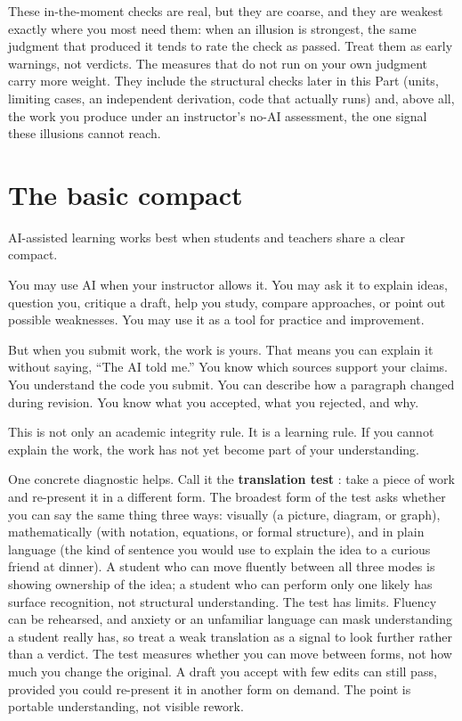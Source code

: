 \documentclass{SIAMbook2023}
\newcommand{\keyterm}[2][\relax]{%
  \textbf{#2}%
  \ifx\relax#1\index{#2|textbf}\else\index{#1|textbf}\fi}
\begin{document}
These in-the-moment checks are real, but they are coarse, and they are weakest exactly where you most need them: when an illusion is strongest, the same judgment that produced it tends to rate the check as passed. Treat them as early warnings, not verdicts. The measures that do not run on your own judgment carry more weight. They include the structural checks later in this Part (units, limiting cases, an independent derivation, code that actually runs) and, above all, the work you produce under an instructor's no-AI assessment, the one signal these illusions cannot reach.

\section{The basic compact}
\label{sec:compact}%

AI-assisted learning works best when students and teachers share a clear compact.

You may use AI when your instructor allows it. You may ask it to explain ideas, question you, critique a draft, help you study, compare approaches, or point out possible weaknesses. You may use it as a tool for practice and improvement.

But when you submit work, the work is yours. That means you can explain it without saying, ``The AI told me.'' You know which sources support your claims. You understand the code you submit. You can describe how a paragraph changed during revision. You know what you accepted, what you rejected, and why.

This is not only an academic integrity rule. It is a learning rule. If you cannot explain the work, the work has not yet become part of your understanding.

One concrete diagnostic helps. Call it the \keyterm{translation test}: take a piece of work and re-present it in a different form. The broadest form of the test asks whether you can say the same thing three ways: visually (a picture, diagram, or graph), mathematically (with notation, equations, or formal structure), and in plain language (the kind of sentence you would use to explain the idea to a curious friend at dinner). A student who can move fluently between all three modes is showing ownership of the idea; a student who can perform only one likely has surface recognition, not structural understanding. The test has limits. Fluency can be rehearsed, and anxiety or an unfamiliar language can mask understanding a student really has, so treat a weak translation as a signal to look further rather than a verdict. The test measures whether you can move between forms, not how much you change the original. A draft you accept with few edits can still pass, provided you could re-present it in another form on demand. The point is portable understanding, not visible rework.
\end{document}
